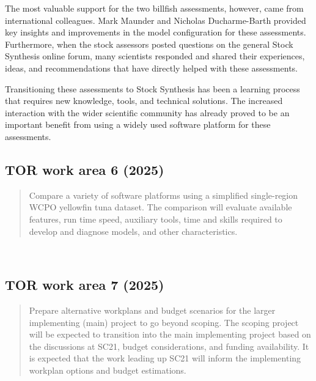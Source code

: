 \documentclass{SCreport}
\begin{document}
The most valuable support for the two billfish assessments, however, came from
international colleagues. Mark Maunder and Nicholas Ducharme-Barth provided key
insights and improvements in the model configuration for these assessments.
Furthermore, when the stock assessors posted questions on the general Stock
Synthesis online forum, many scientists responded and shared their experiences,
ideas, and recommendations that have directly helped with these assessments.

Transitioning these assessments to Stock Synthesis has been a learning process
that requires new knowledge, tools, and technical solutions. The increased
interaction with the wider scientific community has already proved to be an
important benefit from using a widely used software platform for these
assessments.

\vspace{2ex}

\subsection{TOR work area 6 (2025)}

\begin{quote}\sf
  Compare a variety of software platforms using a simplified single-region WCPO
  yellowfin tuna dataset. The comparison will evaluate available features, run
  time speed, auxiliary tools, time and skills required to develop and diagnose
  models, and other characteristics.
\end{quote}

\vspace{2ex}

~

\vspace{2ex}

\subsection{TOR work area 7 (2025)}

\begin{quote}\sf
  Prepare alternative workplans and budget scenarios for the larger implementing
  (main) project to go beyond scoping. The scoping project will be expected to
  transition into the main implementing project based on the discussions at
  SC21, budget considerations, and funding availability. It is expected that the
  work leading up SC21 will inform the implementing workplan options and budget
  estimations.
\end{quote}
\end{document}
